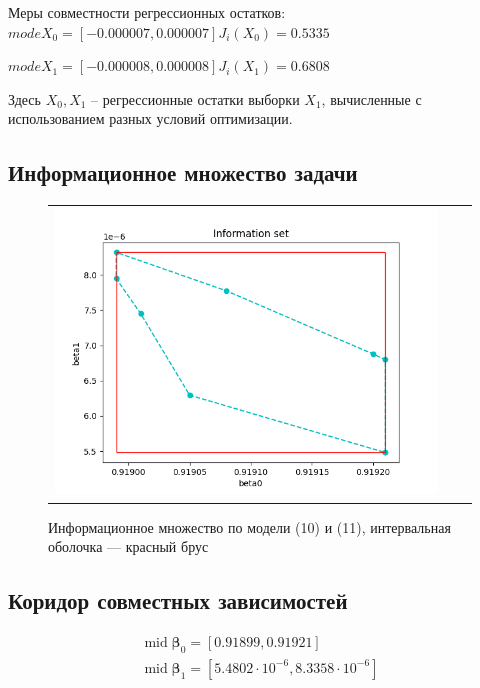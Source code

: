 \documentclass[a4paper,14pt]{article}
\DeclareMathOperator{\midd}{mid}
\begin{document}
	Меры совместности регрессионных остатков:
	$mode X_0 = [-0.000007, 0.000007] J_i(X_0) = 0.5335$
	
	$mode X_1 = [-0.000008, 0.000008] J_i(X_1) = 0.6808$
	
	Здесь $X_0, X_1$ – регрессионные остатки выборки $X_1$, вычисленные с использованием разных
	условий оптимизации.
		
	\subsection{Информационное множество задачи}
	\begin{figure}[H]
		\begin{center}
			\begin{tabular}{ccc}
				\includegraphics[scale=0.8]{../image/inform_set.png}
			\end{tabular}
		\end{center}
		\caption{Информационное множество по модели (10) и (11), интервальная оболочка — красный брус} 
	\end{figure}
	
	\subsection{Коридор совместных зависимостей}
	\begin{equation*}
		\begin{gathered}
			\midd \boldsymbol{\beta}_0 = [0.91899, 0.91921]\\
			\midd \boldsymbol{\beta}_1 = [5.4802 \cdot 10^{-6}, 8.3358 \cdot 10^{-6}]
		\end{gathered}
	\end{equation*}
	
\end{document}
